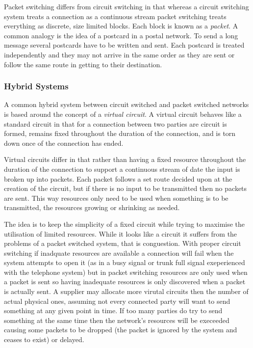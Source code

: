 Packet switching differs from circuit switching in that whereas a
circuit switching system treats a connection as a continuous stream
packet switching treats everything as discrete, size limited blocks.
Each block is known as a {\em packet}.  A common analogy is the idea
of a postcard in a postal network.  To send a long message several
postcards have to be written and sent.  Each postcard is treated
independently and they may not arrive in the same order as they are
sent or follow the same route in getting to their destination.

\subsubsection{Hybrid Systems}

A common hybrid system between circuit switched and packet switched
networks is based around the concept of a {\em virtual circuit}.  A
virtual circuit behaves like a standard circuit in that for a
connection between two parties are circuit is formed, remains fixed
throughout the duration of the connection, and is torn down once of
the connection has ended.

Virtual circuits differ in that rather than having a fixed resource
throughout the duration of the connection to support a continuous
stream of date the input is broken up into packets.  Each packet
follows a set route decided upon at the creation of the circuit, but
if there is no input to be transmitted then no packets are sent.  This
way resources only need to be used when something is to be
transmitted, the resources growing or shrinking as needed.

The idea is to keep the simplicity of a fixed circuit while trying to
maximise the utilisation of limited resources.  While it looks like a
circuit it suffers from the problems of a packet switched system, that
is conguestion.  With proper circuit switching if inadquate resources
are available a connection will fail when the system attempts to open
it (as in a busy signal or trunk full signal exeperienced with the
telephone system) but in packet switching resources are only used when
a packet is sent so having inadequate resources is only discovered
when a packet is actually sent.  A supplier may allocate more virutal
circuits then the number of actual physical ones, assuming not every
connected party will want to send something at any given point in
time.  If too many parties do try to send something at the same time
then the network's resources will be execeeded causing some packets to
be dropped (the packet is ignored by the system and ceases to exist)
or delayed.

